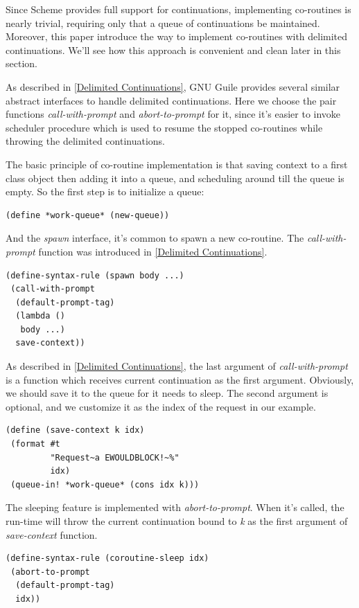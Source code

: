 \documentclass[numbers,numberedpars]{sigplanconf}
\begin{document}
Since Scheme provides full support for continuations, implementing co-routines is nearly trivial, requiring only that a queue of continuations
be maintained. Moreover, this paper introduce the way to implement co-routines with delimited continuations. We'll see how this approach is
convenient and clean later in this section.

As described in \ref{Delimited Continuations}, GNU Guile provides several similar abstract interfaces to handle delimited continuations.
Here we choose the pair functions {\it call-with-prompt} and {\it abort-to-prompt} for it, since it's easier to invoke scheduler procedure
which is used to resume the stopped co-routines while throwing the delimited continuations.

The basic principle of co-routine implementation is that saving context to a first class object then adding it into a queue, and scheduling
around till the queue is empty. So the first step is to initialize a queue:

\begin{lstlisting}
(define *work-queue* (new-queue))
\end{lstlisting}

And the {\it spawn} interface, it's common to spawn a new co-routine. The {\it call-with-prompt} function was introduced in
\ref{Delimited Continuations}.

\begin{lstlisting}
(define-syntax-rule (spawn body ...)
 (call-with-prompt
  (default-prompt-tag)
  (lambda ()
   body ...)
  save-context))
\end{lstlisting}

As described in \ref{Delimited Continuations}, the last argument of {\it call-with-prompt} is a function which receives current continuation
as the first argument. Obviously, we should save it to the queue for it needs to sleep. The second argument is optional, and we customize it
as the index of the request in our example.

\begin{lstlisting}
(define (save-context k idx)
 (format #t
         "Request~a EWOULDBLOCK!~%"
         idx)
 (queue-in! *work-queue* (cons idx k)))
\end{lstlisting}

The sleeping feature is implemented with {\it abort-to-prompt}. When it's called, the run-time will throw the current continuation bound to
{\it k} as the first argument of {\it save-context} function.

\begin{lstlisting}
(define-syntax-rule (coroutine-sleep idx)
 (abort-to-prompt
  (default-prompt-tag)
  idx))
\end{lstlisting}
\end{document}
